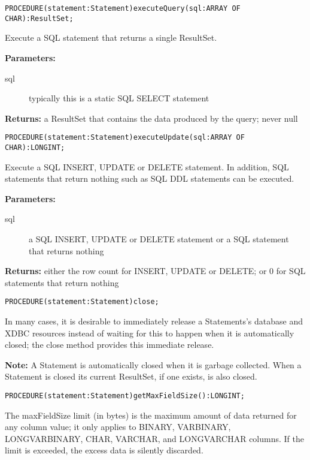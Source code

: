 
\verb'PROCEDURE(statement:Statement)executeQuery(sql:ARRAY OF CHAR):ResultSet;'

     Execute a SQL statement that returns a single ResultSet. 

     {\bf Parameters: } 
\begin{description}
\item[sql] typically this is a static SQL SELECT statement 
\end{description}

     {\bf Returns: } 
          a ResultSet that contains the data produced by the query; never null 


\verb'PROCEDURE(statement:Statement)executeUpdate(sql:ARRAY OF CHAR):LONGINT;'

     Execute a SQL INSERT, UPDATE or DELETE statement. In addition, SQL statements that return nothing such as SQL DDL
     statements can be executed. 

     {\bf Parameters: } 
\begin{description}
\item[sql] a SQL INSERT, UPDATE or DELETE statement or a SQL statement that returns nothing 
\end{description}

     {\bf Returns: } 
          either the row count for INSERT, UPDATE or DELETE; or 0 for SQL statements that return nothing 


\verb'PROCEDURE(statement:Statement)close;'

     In many cases, it is desirable to immediately release a Statements's database and XDBC resources instead of waiting for this to
     happen when it is automatically closed; the close method provides this immediate release. 

     {\bf Note: } A Statement is automatically closed when it is garbage collected. When a Statement is closed its current ResultSet, if one
     exists, is also closed. 


\verb'PROCEDURE(statement:Statement)getMaxFieldSize():LONGINT;'

     The maxFieldSize limit (in bytes) is the maximum amount of data returned for any column value; it only applies to BINARY,
     VARBINARY, LONGVARBINARY, CHAR, VARCHAR, and LONGVARCHAR columns. If the limit is exceeded, the excess data is silently
     discarded. 

